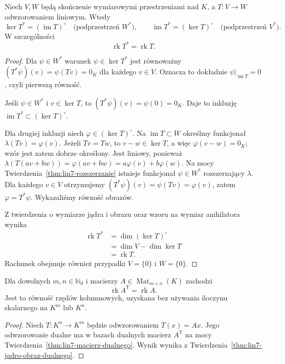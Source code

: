 \begin{twierdzenie}
\label{thm:lin7-jadro-obraz-dualnego}
Niech \(V,W\) będą
skończenie wymiarowymi przestrzeniami
nad \(K\), a \(T\colon V\to W\)
odwzorowaniem liniowym. Wtedy
\[
 \ker T^*=(\operatorname{im}T)^\circ
 \quad\text{(podprzestrzeń \(W^*\))},
 \qquad
 \operatorname{im}T^*=(\ker T)^\circ
 \quad\text{(podprzestrzeń \(V^*\))}.
\]
W szczególności
\[
 \operatorname{rk}T^*=\operatorname{rk}T.
\]
\end{twierdzenie}
\begin{proof}
Dla \(\psi\in W^*\) warunek
\(\psi\in\ker T^*\)
jest równoważny
\((T^*\psi)(v)=\psi(Tv)=0_K\)
dla każdego \(v\in V\).
Oznacza to dokładnie
\(\psi|_{\operatorname{im}T}=0\),
czyli pierwszą równość.

Jeśli \(\psi\in W^*\) i \(v\in\ker T\),
to \((T^*\psi)(v)=\psi(0)=0_K\).
Daje to inkluzję
\(\operatorname{im}T^*
 \subset(\ker T)^\circ\).

Dla drugiej inkluzji niech
\(\varphi\in(\ker T)^\circ\).
Na \(\operatorname{im}T\subset W\)
określmy funkcjonał
\(\lambda(Tv)=\varphi(v)\).
Jeżeli \(Tv=Tw\), to \(v-w\in\ker T\),
a więc \(\varphi(v-w)=0_K\);
wzór jest zatem dobrze określony.
Jest liniowy, ponieważ
\(\lambda(T(av+bw))
=\varphi(av+bw)
=a\varphi(v)+b\varphi(w)\).
Na mocy
Twierdzenia~\ref{thm:lin7-rozszerzanie}
istnieje funkcjonał \(\psi\in W^*\)
rozszerzający \(\lambda\).
Dla każdego \(v\in V\) otrzymujemy
\((T^*\psi)(v)=\psi(Tv)=\varphi(v)\),
zatem \(\varphi=T^*\psi\).
Wykazaliśmy równość obrazów.

Z twierdzenia o wymiarze jądra
i obrazu oraz wzoru na wymiar
anihilatora wynika
\[
 \begin{aligned}
 \operatorname{rk}T^*
 &=\dim(\ker T)^\circ\\
 &=\dim V-\dim\ker T\\
 &=\operatorname{rk}T.
 \end{aligned}
\]
Rachunek obejmuje również
przypadki \(V=\{0\}\) i \(W=\{0\}\).
\end{proof}

\begin{wniosek}
\label{cor:lin7-rzad-transpozycji}
Dla dowolnych \(m,n\in\mathbb N_0\)
i macierzy \(A\in
\operatorname{Mat}_{m\times n}(K)\)
zachodzi
\[
 \operatorname{rk}A^{\mathsf T}
 =\operatorname{rk}A.
\]
Jest to równość rzędów kolumnowych,
uzyskana bez używania iloczynu
skalarnego na \(K^m\) lub \(K^n\).
\end{wniosek}
\begin{proof}
Niech \(T\colon K^n\to K^m\)
będzie odwzorowaniem \(T(x)=Ax\).
Jego odwzorowanie dualne ma
w bazach dualnych macierz
\(A^{\mathsf T}\) na mocy
Twierdzenia~\ref{thm:lin7-macierz-dualnego}.
Wynik wynika z
Twierdzenia~\ref{thm:lin7-jadro-obraz-dualnego}.
\end{proof}

